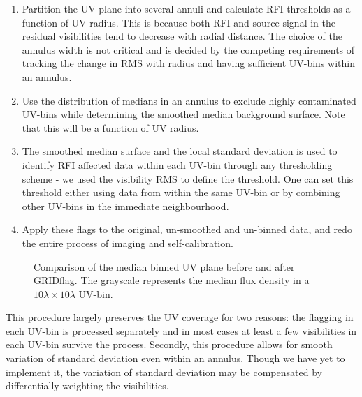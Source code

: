 \documentclass[twocolumn]{aastex61}
\begin{document}
{\begin{enumerate}
   \item Partition the UV plane into several annuli and calculate RFI
      thresholds as a function of UV radius. This is because both RFI and source
      signal in the residual visibilities tend to decrease with radial distance.
      The choice of the annulus width is not critical and is decided by the
      competing requirements of tracking the change in RMS with radius and having
      sufficient UV-bins within an annulus.

   \item Use the distribution of medians in an annulus to exclude highly
      contaminated UV-bins while determining the smoothed median
      background surface. Note that this will be a function of UV radius.

   \item The smoothed median surface and the local standard deviation is
      used to identify RFI affected data within each UV-bin through any
      thresholding scheme - we used the visibility RMS to define the threshold.
      One can set this threshold either using data from within the same UV-bin
      or by combining other UV-bins in the immediate neighbourhood.

   \item Apply these flags to the original, un-smoothed and un-binned
      data, and redo the entire process of imaging and self-calibration.

\end{enumerate}

\begin{figure*}[htbp]
   \caption{Comparison of the median binned UV plane before and
   after GRIDflag. The grayscale represents the
   median flux density in a $10\lambda \times 10\lambda$ UV-bin.}
   \label{fig:gridded_uv_plane}
\end{figure*}

This procedure largely preserves the UV coverage for two reasons: the flagging
in each UV-bin is processed separately and in most cases at least a few
visibilities in each UV-bin survive the process.  Secondly, this procedure
allows for smooth variation of standard deviation even within an annulus. Though
we have yet to implement it, the variation of standard deviation may be
compensated by differentially weighting the visibilities.

}
\end{document}

